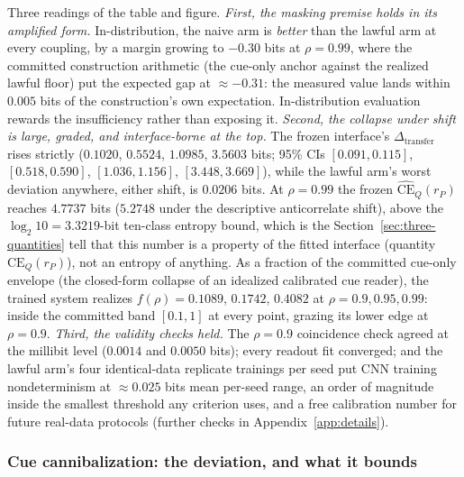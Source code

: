 \documentclass[twocolumn,10pt]{article}
\theoremstyle{definition}
\theoremstyle{remark}
\newcommand{\CE}{\mathrm{CE}}
\newcommand{\CEQ}[1]{\CE_{Q}({#1})}
\newcommand{\rP}{r_{P}}
\newcommand{\CEhat}{\widehat{\CE}}
\begin{document}
Three readings of the table and figure.
\emph{First, the masking premise holds in its amplified form.}
In-distribution, the naive arm is \emph{better} than the lawful arm
at every coupling, by a margin growing to $-0.30$ bits
at $\rho = 0.99$, where the committed construction arithmetic (the
cue-only anchor against the realized lawful floor) put the expected gap
at $\approx -0.31$: the measured value lands within $0.005$ bits of the
construction's own expectation. In-distribution evaluation rewards
the insufficiency rather than exposing it.
\emph{Second, the collapse under shift is large, graded, and
interface-borne at the top.} The frozen interface's
$\Delta_{\mathrm{transfer}}$ rises strictly ($0.1020$, $0.5524$,
$1.0985$, $3.5603$ bits; 95\% CIs $[0.091, 0.115]$, $[0.518, 0.590]$,
$[1.036, 1.156]$, $[3.448, 3.669]$), while the lawful arm's worst
deviation anywhere, either shift, is $0.0206$ bits. At $\rho = 0.99$
the frozen $\CEhat_Q(\rP)$ reaches $4.7737$ bits ($5.2748$ under the
descriptive anticorrelate shift), above the $\log_2 10 = 3.3219$-bit
ten-class entropy bound, which is the Section~\ref{sec:three-quantities}
tell that this number is a property of the fitted interface (quantity
$\CEQ{\rP}$), not an entropy of anything. As a fraction of the
committed cue-only envelope (the closed-form collapse of an idealized
calibrated cue reader), the trained system realizes
$f(\rho) = 0.1089$, $0.1742$, $0.4082$ at $\rho = 0.9, 0.95, 0.99$:
inside the committed band $[0.1, 1]$ at every point, grazing its lower
edge at $\rho = 0.9$. \emph{Third, the validity checks held.} The
$\rho = 0.9$ coincidence check agreed at the millibit level
($0.0014$ and $0.0050$ bits); every readout fit converged; and the
lawful arm's four identical-data replicate trainings per seed put CNN
training nondeterminism at $\approx 0.025$ bits mean per-seed range,
an order of magnitude inside the smallest threshold any criterion
uses, and a free calibration number for future real-data protocols
(further checks in Appendix~\ref{app:details}).

\subsubsection{Cue cannibalization: the deviation, and what it bounds}
\label{sec:exp3-cannibal}
\end{document}
